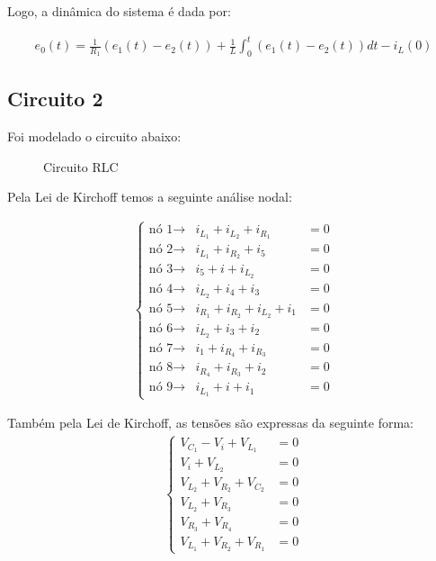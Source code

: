 \documentclass[fleqn, 11pt]{article}
\begin{document}
Logo, a dinâmica do sistema é dada por:

\begin{align*}
e_{0}(t) = \frac{1}{R_1}  (e_1(t) - e_2(t)) + \frac{1}{L} \int_{0}^{t} (e_1(t) - e_2(t)) dt - i_{L}(0)
\end{align*}
\newpage
\subsection{Circuito 2}
Foi modelado o circuito abaixo:

\begin{figure}[H]
\label{figure:circuito_2}
   \caption{Circuito RLC}
\end{figure}

Pela Lei de Kirchoff temos a seguinte análise nodal:

\begin{align*}
\left\{\begin{matrix}
\text{nó 1} \rightarrow &  i_{L_{1}} + i_{L_2} + i_{R_1} & = 0 \\
\text{nó 2} \rightarrow &  i_{L_{1}} + i_{R_2} + i_{5} & = 0 \\
\text{nó 3} \rightarrow &  i_{5} + i + i_{L_2} & = 0 \\
\text{nó 4} \rightarrow &  i_{L_2} + i_{4} + i_3 & = 0 \\
\text{nó 5} \rightarrow &  i_{R_1} + i_{R_2} + i_{L_2} + i_1 & = 0 \\
\text{nó 6} \rightarrow &  i_{L_2} + i_3 + i_2 & = 0 \\
\text{nó 7} \rightarrow &  i_1 + i_{R_4} + i_{R_3} & = 0 \\
\text{nó 8} \rightarrow &  i_{R_4} + i_{R_3} + i_{2} & = 0 \\
\text{nó 9} \rightarrow &  i_{L_1} + i + i_{1} & = 0 
\end{matrix}\right.
\end{align*}

Também pela Lei de Kirchoff, as tensões são expressas da seguinte forma:
\begin{align*}
\left\{\begin{matrix}
V_{C_1} - V_{i} + V_{L_{1}} & = 0 \\
V_{i} + V_{L_{2}} & = 0 \\
V_{L_{2}} + V_{R_{2}} + V_{C_{2}} & = 0 \\
V_{L_2} + V_{R_3} & = 0 \\
V_{R_3} + V_{R_4} & = 0 \\
V_{L_1} + V_{R_2} + V_{R_1} & = 0
\end{matrix}\right.
\end{align*}
\end{document}
